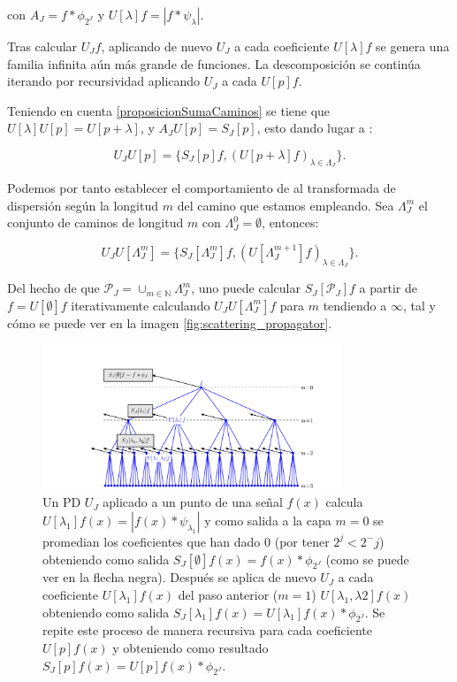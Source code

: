 \noindent con $A_J=f\ast \phi_{2^J}$ y $U[\lambda]f=\left| f\ast \psi_\lambda \right|$. 

\medskip

\noindent Tras calcular $U_Jf$, aplicando de nuevo $U_J$ a cada coeficiente $U[\lambda]f$ se genera una familia infinita aún más grande de funciones. La descomposición se continúa iterando  por recursividad aplicando $U_J$ a cada $U[p]f$. 

\medskip

\noindent Teniendo en cuenta \autoref{proposicionSumaCaminos} se tiene que  $U[\lambda]U[p]=U[p+\lambda]$, y $A_JU[p]=S_J[p]$, esto dando lugar a : 

\begin{equation}
  U_JU[p]=\lbrace S_J[p]f,(U[p+\lambda]f)_{\lambda\in\Lambda_J}\rbrace. 
\end{equation}



\medskip

\noindent Podemos por tanto establecer el comportamiento de al transformada de dispersión según la longitud $m$ del camino que estamos empleando. Sea $\Lambda_J^m$ el conjunto de caminos de longitud $m$ con $\Lambda_J^0={\emptyset}$, entonces:


\begin{equation} \label{eq::1.5}
  U_J U[\Lambda_J^m]=\lbrace S_J[\Lambda_J^m]f,(U[\Lambda_J^{m+1}]f)_{\lambda\in\Lambda_J}\rbrace.
\end{equation}

\noindent Del hecho de que $\mathcal{P}_J=\cup_{m\in \mathbb{N}}\Lambda_J^m$, uno puede calcular $S_J[\mathcal{P}_J]f$ a partir de $f=U[\emptyset]f$ iterativamente calculando $U_J U[\Lambda_J^m]f$ para $m$ tendiendo a $\infty$, tal y cómo se puede ver en la imagen \autoref{fig:scattering_propagator}. 

\begin{figure} [!h]
  \centering
  \includegraphics[width=0.8\textwidth]{img/ScatteringPropagator.png}
  \caption{Un PD $U_J$ aplicado a un punto de una señal $f(x)$ calcula $U[\lambda_1]f(x)=|f(x)\ast \psi_{\lambda_1}|$ y como salida a la capa $m=0$ se promedian los coeficientes que han dado $0$ (por tener $2^j<2^-j$) obteniendo como salida $S_J[\emptyset]f(x)=f(x)\ast \phi_{2^J}$ (como se puede ver en la flecha negra). Después se aplica de nuevo $U_J$ a cada coeficiente $U[\lambda_1]f(x)$ del paso anterior ($m=1$) $U[\lambda_1,\lambda2]f(x)$ obteniendo como salida $S_J[\lambda_1]f(x)=U[\lambda_1]f(x) \ast \phi_{2^J}$. Se repite este proceso de manera recursiva para cada coeficiente $U[p]f(x)$ y obteniendo como resultado $S_J[p]f(x)=U[p]f(x) \ast \phi_{2^J}$. }
  \label{fig:scattering_propagator}
\end{figure}


